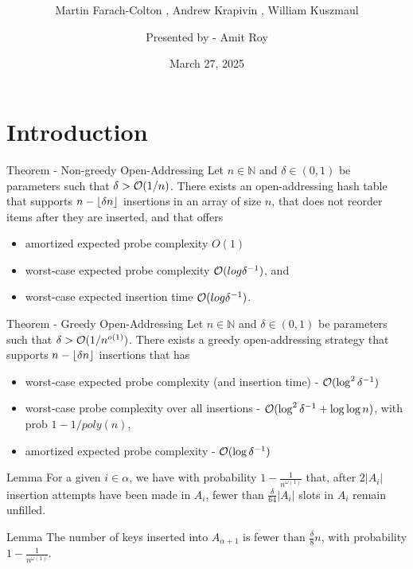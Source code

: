 \documentclass{beamer}
\title{ \sc \color{blue}{Optimal Bounds for Open Addressing Without Reordering}}
\subtitle{Martin Farach-Colton , Andrew Krapivin , William Kuszmaul}
\author{Presented by - Amit Roy }
\institute{}
\date{March 27, 2025}
\begin{document}
 
\begin{frame}
\titlepage
\end{frame} 



\section{Introduction}


\begin{frame}
	\begin{block}{Theorem - Non-greedy Open-Addressing}
	Let $n \in \mathbb{N}$ and $\delta \in(0, 1)$ be parameters such that $\delta > 
	{\cal O}(1/n)$. There exists an open-addressing hash table that supports $n - \left\lfloor \delta n \right\rfloor$ insertions in an array of size $n$, that does not reorder items after they are inserted, and that oﬀers
	\begin{itemize}
		\item amortized expected probe complexity $O(1)$
		\item worst-case expected probe complexity ${\cal O}(log \delta^{-1})$, and
		\item worst-case expected
		insertion time ${\cal O}(log \delta^{-1})$.
	\end{itemize}
	\end{block}
\end{frame}

\begin{frame}
	\begin{block}{Theorem - Greedy Open-Addressing}
		Let $n \in \mathbb{N}$ and $\delta \in(0, 1)$ be parameters such that $\delta > 
		{\cal O}(1/n^{o(1)})$.
			 There exists a greedy open-addressing strategy that supports $n - \left\lfloor \delta n \right\rfloor$ insertions that has 
			\begin{itemize}
				\item worst-case expected probe complexity (and insertion time) - ${\cal O}(\log^2{\delta^{-1}} )$ 
				\item worst-case probe complexity over all insertions - ${\cal O}(\log^2{\delta^{-1}} + \log{\log{n}})$, with prob $1- 1/poly(n)$, 
				\item amortized expected probe complexity - ${\cal O}(\log{\delta^{-1}})$
			\end{itemize}
		
	\end{block}
\end{frame}

\begin{frame}
	\begin{block}{Lemma}
		For a given $i \in \alpha$, we have with probability $1 - \frac{1}{n^{\omega(1)}}$ that, after $2|A_i|$ insertion attempts have been made in $A_i$, fewer than $\frac{\delta}{64} |A_i|$ slots in $A_i$ remain unfilled.
	\end{block}

	\begin{block}{Lemma}
	The number of keys inserted into $A_{\alpha + 1}$ is fewer than $\frac{\delta}{8}n$, with probability $1 - \frac{1}{n^{\omega(1)}}$.
\end{block}

\end{frame}
\end{document}
